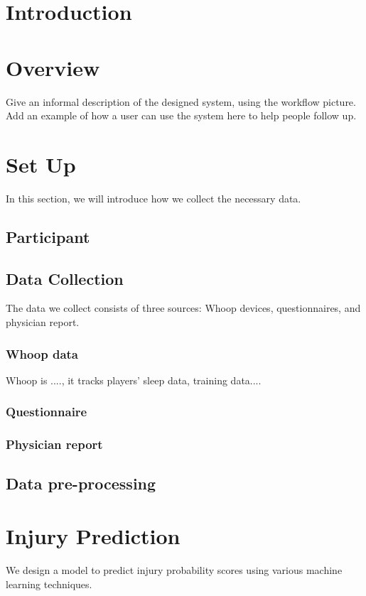 \documentclass[manuscript,acmsmall,anonymous,review,screen,nonacm=true, authorversion=true]{acmart}
\begin{document}
\section{Introduction}


\section{Overview}
Give an informal description of the designed system, using the workflow picture. Add an example of how a user can use the system here to help people follow up.

\section{Set Up}
In this section, we will introduce how we collect the necessary data.

\subsection{Participant}

\subsection{Data Collection}
  The data we collect consists of three sources:  Whoop devices, questionnaires, and physician report.
  
  \subsubsection{Whoop data}
  Whoop is ...., it tracks players' sleep data, training data....  

  \subsubsection{Questionnaire}


  \subsubsection{Physician report}

\subsection{Data pre-processing}

\section{Injury Prediction}
  We design a model to predict injury probability scores using various machine learning techniques.  
\end{document}
